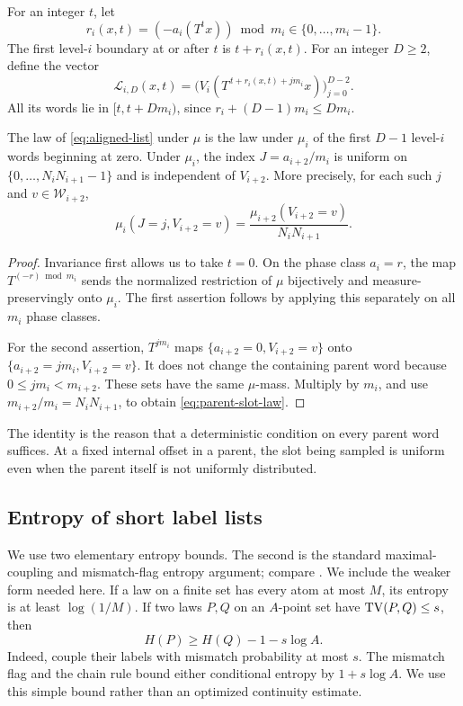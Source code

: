 For an integer $t$, let
\[
 r_i(x,t)=(-a_i(T^t x))\bmod m_i\in\{0,\ldots,m_i-1\}.
\]
The first level-$i$ boundary at or after $t$ is $t+r_i(x,t)$.
For an integer $D\ge2$, define the vector
\begin{equation}\label{eq:aligned-list}
 \mathcal L_{i,D}(x,t)=
 \bigl(V_i(T^{\,t+r_i(x,t)+jm_i}x)\bigr)_{j=0}^{D-2}.
\end{equation}
All its words lie in $[t,t+Dm_i)$, since
$r_i+(D-1)m_i\le Dm_i$.

\begin{lemma}\label{lem:aligned-law}
The law of \eqref{eq:aligned-list} under $\mu$ is the law under
$\mu_i$ of the first $D-1$ level-$i$ words beginning at zero.
Under $\mu_i$, the index
$J=a_{i+2}/m_i$ is uniform on
$\{0,\ldots,N_iN_{i+1}-1\}$ and is independent of $V_{i+2}$.
More precisely, for each such $j$ and $v\in\mathcal W_{i+2}$,
\begin{equation}\label{eq:parent-slot-law}
 \mu_i(J=j,V_{i+2}=v)
 =\frac{\mu_{i+2}(V_{i+2}=v)}{N_iN_{i+1}}.
\end{equation}
\end{lemma}

\begin{proof}
Invariance first allows us to take $t=0$. On the phase class
$a_i=r$, the map $T^{(-r)\bmod m_i}$ sends the normalized
restriction of $\mu$ bijectively and measure-preservingly onto
$\mu_i$. The first assertion follows by applying this separately
on all $m_i$ phase classes.

For the second assertion, $T^{jm_i}$ maps
$\{a_{i+2}=0,V_{i+2}=v\}$ onto
$\{a_{i+2}=jm_i,V_{i+2}=v\}$.
It does not change the containing parent word because
$0\le jm_i<m_{i+2}$. These sets have the same $\mu$-mass.
Multiply by $m_i$, and use
$m_{i+2}/m_i=N_iN_{i+1}$, to obtain
\eqref{eq:parent-slot-law}.
\end{proof}

The identity is the reason that a deterministic condition on every
parent word suffices. At a fixed internal offset in a parent,
the slot being sampled is uniform even when the parent itself is
not uniformly distributed.

\subsection{Entropy of short label lists}

We use two elementary entropy bounds. The second is the standard
maximal-coupling and mismatch-flag entropy argument; compare
\cite[Theorems~1--3]{Sason2013}. We include the weaker form needed here. If a law on a finite set
has every atom at most $M$, its entropy is at least
$\log(1/M)$. If two laws $P,Q$ on an $A$-point set have
$\operatorname{TV}(P,Q)\le s$, then
\begin{equation}\label{eq:tv-entropy}
 H(P)\ge H(Q)-1-s\log A.
\end{equation}
Indeed, couple their labels with mismatch probability at most $s$.
The mismatch flag and the chain rule bound either conditional
entropy by $1+s\log A$. We use this simple bound rather than an
optimized continuity estimate.

